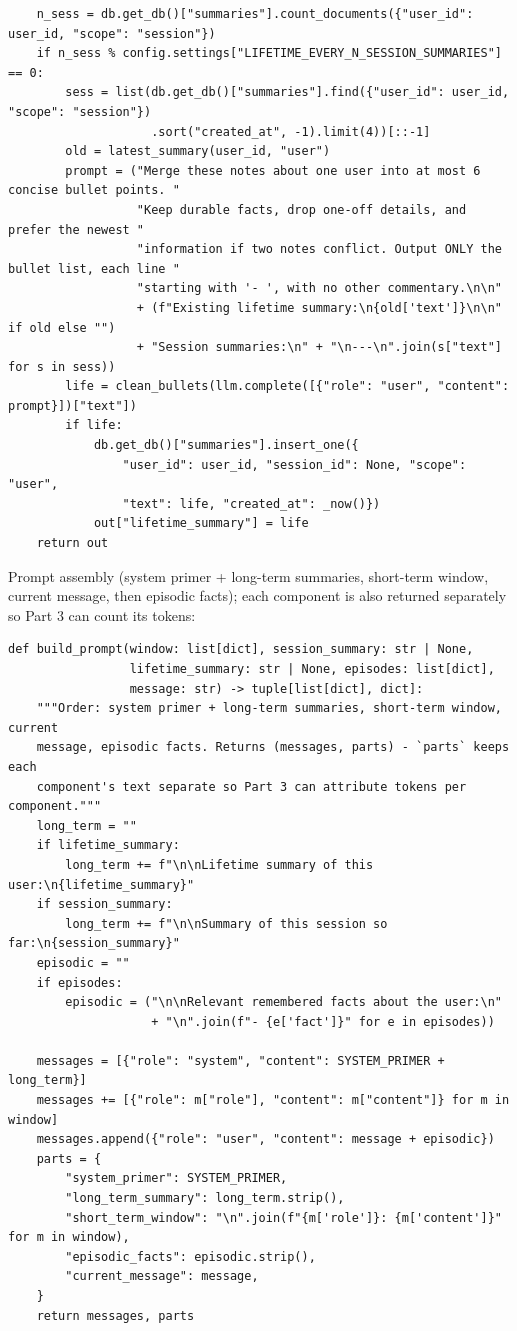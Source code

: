 \documentclass[11pt]{article}
\begin{document}
\begin{lstlisting}
    n_sess = db.get_db()["summaries"].count_documents({"user_id": user_id, "scope": "session"})
    if n_sess % config.settings["LIFETIME_EVERY_N_SESSION_SUMMARIES"] == 0:
        sess = list(db.get_db()["summaries"].find({"user_id": user_id, "scope": "session"})
                    .sort("created_at", -1).limit(4))[::-1]
        old = latest_summary(user_id, "user")
        prompt = ("Merge these notes about one user into at most 6 concise bullet points. "
                  "Keep durable facts, drop one-off details, and prefer the newest "
                  "information if two notes conflict. Output ONLY the bullet list, each line "
                  "starting with '- ', with no other commentary.\n\n"
                  + (f"Existing lifetime summary:\n{old['text']}\n\n" if old else "")
                  + "Session summaries:\n" + "\n---\n".join(s["text"] for s in sess))
        life = clean_bullets(llm.complete([{"role": "user", "content": prompt}])["text"])
        if life:
            db.get_db()["summaries"].insert_one({
                "user_id": user_id, "session_id": None, "scope": "user",
                "text": life, "created_at": _now()})
            out["lifetime_summary"] = life
    return out
\end{lstlisting}
\endgroup
Prompt assembly (system primer + long-term summaries, short-term window, current message, then episodic facts); each component is also returned separately so Part 3 can count its tokens:

\begingroup\lstset{basicstyle=\ttfamily\scriptsize}
\begin{lstlisting}
def build_prompt(window: list[dict], session_summary: str | None,
                 lifetime_summary: str | None, episodes: list[dict],
                 message: str) -> tuple[list[dict], dict]:
    """Order: system primer + long-term summaries, short-term window, current
    message, episodic facts. Returns (messages, parts) - `parts` keeps each
    component's text separate so Part 3 can attribute tokens per component."""
    long_term = ""
    if lifetime_summary:
        long_term += f"\n\nLifetime summary of this user:\n{lifetime_summary}"
    if session_summary:
        long_term += f"\n\nSummary of this session so far:\n{session_summary}"
    episodic = ""
    if episodes:
        episodic = ("\n\nRelevant remembered facts about the user:\n"
                    + "\n".join(f"- {e['fact']}" for e in episodes))

    messages = [{"role": "system", "content": SYSTEM_PRIMER + long_term}]
    messages += [{"role": m["role"], "content": m["content"]} for m in window]
    messages.append({"role": "user", "content": message + episodic})
    parts = {
        "system_primer": SYSTEM_PRIMER,
        "long_term_summary": long_term.strip(),
        "short_term_window": "\n".join(f"{m['role']}: {m['content']}" for m in window),
        "episodic_facts": episodic.strip(),
        "current_message": message,
    }
    return messages, parts
\end{lstlisting}
\endgroup
\end{document}
